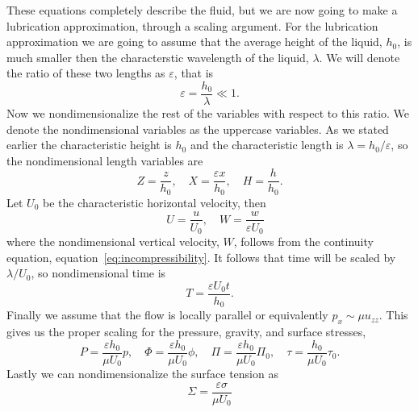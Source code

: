   These equations completely describe the fluid, but we are now going to make a
  lubrication approximation, through a scaling argument.
  For the lubrication approximation we are going to assume that the average height of
  the liquid, \(h_0\), is much smaller then the characterstic wavelength of the liquid,
  \(\lambda \).
  We will denote the ratio of these two lengths as \(\varepsilon \), that is
  \begin{equation}
    \varepsilon = \frac{h_0}{\lambda} \ll 1.
  \end{equation}
  Now we nondimensionalize the rest of the variables with respect to this ratio.
  We denote the nondimensional variables as the uppercase variables.
  As we stated earlier the characteristic height is \(h_0\) and the characteristic
  length is \(\lambda = h_0/\varepsilon \), so the nondimensional length variables are
  \begin{equation}
    Z = \frac{z}{h_0}, \quad X = \frac{\varepsilon x}{h_0}, \quad H = \frac{h}{h_0}.
  \end{equation}
  Let \(U_0\) be the characteristic horizontal velocity, then
  \begin{equation}
    \quad U = \frac{u}{U_0}, \quad W = \frac{w}{\varepsilon U_0}
  \end{equation}
  where the nondimensional vertical velocity, \(W\), follows from the continuity
  equation, equation~\eqref{eq:incompressibility}.
  It follows that time will be scaled by \(\lambda/U_0\), so nondimensional time is
  \begin{equation}
    T = \frac{\varepsilon U_0 t}{h_0}.
  \end{equation}
  Finally we assume that the flow is locally parallel or equivalently
  \(p_x \sim \mu u_{zz}\).
  This gives us the proper scaling for the pressure, gravity, and surface stresses,
  \begin{equation}
    P = \frac{\varepsilon h_0}{\mu U_0} p, \quad
    \Phi = \frac{\varepsilon h_0}{\mu U_0}\phi, \quad
    \Pi = \frac{\varepsilon h_0}{\mu U_0}\Pi_0, \quad
    \tau = \frac{h_0}{\mu U_0}\tau_0.
  \end{equation}
  Lastly we can nondimensionalize the surface tension as
  \begin{equation}
    \Sigma = \frac{\varepsilon \sigma}{\mu U_0}
  \end{equation}

